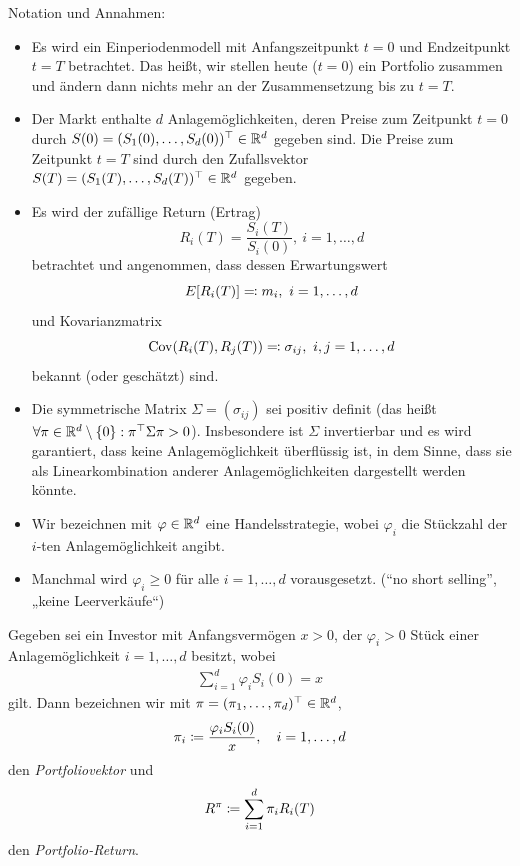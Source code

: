 \documentclass[a4paper,twoside,DIV15,BCOR12mm]{scrbook}
\DeclareMathOperator{\Cov}{Cov}
\begin{document}
Notation und Annahmen:
\begin{itemize}
\item Es wird ein Einperiodenmodell mit Anfangszeitpunkt $t=0$ und Endzeitpunkt $t=T$ betrachtet. Das heißt, wir stellen heute ($t=0$) ein Portfolio zusammen und ändern dann nichts mehr an der Zusammensetzung bis zu $t=T$.
\item Der Markt enthalte $d$ Anlagemöglichkeiten, deren Preise zum Zeitpunkt $t=0$ durch $S(0) = (S_1(0),\ldots,S_d(0))^\top \in \mathbb{R}^d$ gegeben sind. Die Preise zum Zeitpunkt $t=T$ sind durch den Zufallsvektor $S(T)=(S_1(T),\ldots,S_d(T))^\top\in\mathbb{R}^d$ gegeben.
\item Es wird der zufällige Return (Ertrag)
\[
R_i(T) = \frac{S_i(T)}{S_i(0)},\ i=1,\ldots,d
\]
betrachtet und angenommen, dass dessen Erwartungswert 
\[
E[R_i(T)]\ad m_i,\ i=1,\ldots,d
\]
und Kovarianzmatrix 
\[
\Cov(R_i(T),R_j(T))\ad \sigma_{ij},\ i,j=1,\ldots,d
\]
bekannt (oder geschätzt) sind.

\item Die symmetrische Matrix $\Sigma = (\sigma_{ij})$ sei positiv definit (das heißt $\forall \pi\in\mathbb{R}^d\setminus\{0\}: \pi^\top \Sigma \pi > 0$). Insbesondere ist $\Sigma$ invertierbar und es wird garantiert, dass keine Anlagemöglichkeit überflüssig ist, in dem Sinne, dass sie als Linearkombination anderer Anlagemöglichkeiten dargestellt werden könnte.
\item Wir bezeichnen mit $\varphi\in\mathbb{R}^d$ eine Handelsstrategie, wobei $\varphi_i$ die Stückzahl der $i$-ten Anlagemöglichkeit angibt.
\item Manchmal wird $\varphi_i \ge 0$ für alle $i=1,\ldots,d$ vorausgesetzt. (“no short selling”, „keine Leerverkäufe“)
\end{itemize}

\begin{definition}
Gegeben sei ein Investor mit Anfangsvermögen $x>0$, der $\varphi_i>0$ Stück einer Anlagemöglichkeit $i=1,\ldots,d$ besitzt, wobei 
\begin{align*}
\sum_{i=1}^d \varphi_i S_i(0)= x \tag{Budgetgleichung}
\end{align*}
gilt. Dann bezeichnen wir mit $\pi=(\pi_1,\ldots,\pi_d)^\top\in\mathbb{R}^d$,
\begin{align*}
\pi_i \da \frac{\varphi_iS_i(0)}x,\quad i=1,\dots,d
\end{align*}
den \emph{Portfoliovektor} und
\begin{align*}
R^\pi \da \sum_{i=1}^d \pi_iR_i(T)
\end{align*}
den \emph{Portfolio-Return}.
\end{definition}
\end{document}
